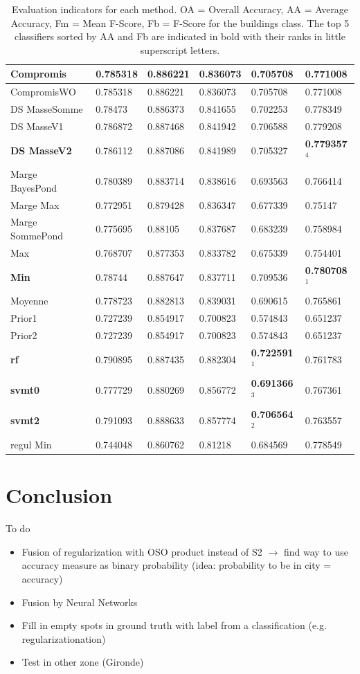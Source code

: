 \documentclass[10pt]{article}
\begin{document}
\begin{table}[H]
\begin{tabular}{llllll}
Compromis & 0.785318 & 0.886221 & 0.836073 & 0.705708 & 0.771008\\\hline
CompromisWO & 0.785318 & 0.886221 & 0.836073 & 0.705708 & 0.771008\\\hline
DS MasseSomme & 0.78473 & 0.886373 & 0.841655 & 0.702253 & 0.778349\\\hline
DS MasseV1 & 0.786872 & 0.887468 & 0.841942 & 0.706588 & 0.779208\\\hline
\textbf{DS MasseV2} & 0.786112 & 0.887086 & 0.841989 & 0.705327 & \textbf{0.779357$^4$}\\\hline
Marge BayesPond & 0.780389 & 0.883714 & 0.838616 & 0.693563 & 0.766414\\\hline
Marge Max & 0.772951 & 0.879428 & 0.836347 & 0.677339 & 0.75147\\\hline
Marge SommePond & 0.775695 & 0.88105 & 0.837687 & 0.683239 & 0.758984\\\hline
Max & 0.768707 & 0.877353 & 0.833782 & 0.675339 & 0.754401\\\hline
\textbf{Min} & 0.78744 & 0.887647 & 0.837711 & 0.709536 & \textbf{0.780708$^1$}\\\hline
Moyenne & 0.778723 & 0.882813 & 0.839031 & 0.690615 & 0.765861\\\hline
Prior1 & 0.727239 & 0.854917 & 0.700823 & 0.574843 & 0.651237\\\hline
Prior2 & 0.727239 & 0.854917 & 0.700823 & 0.574843 & 0.651237\\\hline
\textbf{rf} & 0.790895 & 0.887435 & 0.882304 & \textbf{0.722591$^1$} & 0.761783\\\hline
\textbf{svmt0} & 0.777729 & 0.880269 & 0.856772 & \textbf{0.691366$^3$} & 0.767361\\\hline
\textbf{svmt2} & 0.791093 & 0.888633 & 0.857774 & \textbf{0.706564$^2$} & 0.763557\\\hline
regul Min & 0.744048 & 0.860762 & 0.81218 & 0.684569 & 0.778549
\end{tabular}
\caption{Evaluation indicators for each method. OA = Overall Accuracy, AA = Average Accuracy, Fm = Mean F-Score, Fb = F-Score for the buildings class. The top 5 classifiers sorted by AA and Fb are indicated in bold with their ranks in little superscript letters.}
\label{table:eval}
\end{table}
\newpage
\section{Conclusion}
To do 
\begin{itemize}
    \item Fusion of regularization with OSO product instead of S2 $\rightarrow$ find way to use accuracy measure as binary probability (idea: probability to be in city = accuracy)
    \item Fusion by Neural Networks
    \item Fill in empty spots in ground truth with label from a classification (e.g. regularizationation)
    \item Test in other zone (Gironde)
\end{itemize}
\pagebreak
\printbibliography[heading=bibintoc,heading=bibnumbered]%
\end{document}

